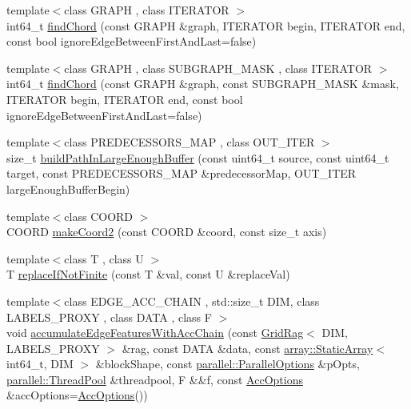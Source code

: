 \begin{DoxyCompactItemize}
{\footnotesize template$<$class G\+R\+A\+P\+H , class I\+T\+E\+R\+A\+T\+O\+R $>$ }\\int64\+\_\+t \hyperlink{namespacenifty_1_1graph_a5efcd6025d7a1aa6ec3e9826f05d73f1}{find\+Chord} (const G\+R\+A\+P\+H \&graph, I\+T\+E\+R\+A\+T\+O\+R begin, I\+T\+E\+R\+A\+T\+O\+R end, const bool ignore\+Edge\+Between\+First\+And\+Last=false)
\item 
{\footnotesize template$<$class G\+R\+A\+P\+H , class S\+U\+B\+G\+R\+A\+P\+H\+\_\+\+M\+A\+S\+K , class I\+T\+E\+R\+A\+T\+O\+R $>$ }\\int64\+\_\+t \hyperlink{namespacenifty_1_1graph_aa3515c9d13aba223fd3f7771db67af53}{find\+Chord} (const G\+R\+A\+P\+H \&graph, const S\+U\+B\+G\+R\+A\+P\+H\+\_\+\+M\+A\+S\+K \&mask, I\+T\+E\+R\+A\+T\+O\+R begin, I\+T\+E\+R\+A\+T\+O\+R end, const bool ignore\+Edge\+Between\+First\+And\+Last=false)
\item 
{\footnotesize template$<$class P\+R\+E\+D\+E\+C\+E\+S\+S\+O\+R\+S\+\_\+\+M\+A\+P , class O\+U\+T\+\_\+\+I\+T\+E\+R $>$ }\\size\+\_\+t \hyperlink{namespacenifty_1_1graph_ad5fff1c63a572469a352e1645f9d3d0c}{build\+Path\+In\+Large\+Enough\+Buffer} (const uint64\+\_\+t source, const uint64\+\_\+t target, const P\+R\+E\+D\+E\+C\+E\+S\+S\+O\+R\+S\+\_\+\+M\+A\+P \&predecessor\+Map, O\+U\+T\+\_\+\+I\+T\+E\+R large\+Enough\+Buffer\+Begin)
\item 
{\footnotesize template$<$class C\+O\+O\+R\+D $>$ }\\C\+O\+O\+R\+D \hyperlink{namespacenifty_1_1graph_aca62625e3c61b810e2f6cda338de2c26}{make\+Coord2} (const C\+O\+O\+R\+D \&coord, const size\+\_\+t axis)
\item 
{\footnotesize template$<$class T , class U $>$ }\\T \hyperlink{namespacenifty_1_1graph_a511023b23336eb0591905cc2034b00a5}{replace\+If\+Not\+Finite} (const T \&val, const U \&replace\+Val)
\item 
{\footnotesize template$<$class E\+D\+G\+E\+\_\+\+A\+C\+C\+\_\+\+C\+H\+A\+I\+N , std\+::size\+\_\+t D\+I\+M, class L\+A\+B\+E\+L\+S\+\_\+\+P\+R\+O\+X\+Y , class D\+A\+T\+A , class F $>$ }\\void \hyperlink{namespacenifty_1_1graph_a367cdb1cc5ac050b60098dc22effd452}{accumulate\+Edge\+Features\+With\+Acc\+Chain} (const \hyperlink{classnifty_1_1graph_1_1GridRag}{Grid\+Rag}$<$ D\+I\+M, L\+A\+B\+E\+L\+S\+\_\+\+P\+R\+O\+X\+Y $>$ \&rag, const D\+A\+T\+A \&data, const \hyperlink{namespacenifty_1_1array_a683f151f19c851754e0c6d55ed16a0c2}{array\+::\+Static\+Array}$<$ int64\+\_\+t, D\+I\+M $>$ \&block\+Shape, const \hyperlink{classnifty_1_1parallel_1_1ParallelOptions}{parallel\+::\+Parallel\+Options} \&p\+Opts, \hyperlink{classnifty_1_1parallel_1_1ThreadPool}{parallel\+::\+Thread\+Pool} \&threadpool, F \&\&f, const \hyperlink{structnifty_1_1graph_1_1AccOptions}{Acc\+Options} \&acc\+Options=\hyperlink{structnifty_1_1graph_1_1AccOptions}{Acc\+Options}())

\end{DoxyCompactItemize}
